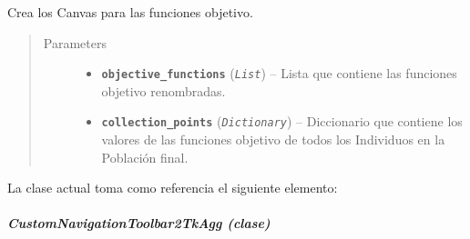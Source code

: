 \documentclass[letterpaper,10pt,english]{sphinxmanual}
\begin{document}
\begin{fulllineitems}
\begin{fulllineitems}
Crea los Canvas para las funciones objetivo.
\begin{quote}\begin{description}
\item[{Parameters}] \leavevmode\begin{itemize}
\item {} 
\textbf{\texttt{objective\_functions}} (\emph{\texttt{List}}) -- Lista que contiene las funciones objetivo renombradas.

\item {} 
\textbf{\texttt{collection\_points}} (\emph{\texttt{Dictionary}}) -- Diccionario que contiene los valores de las funciones objetivo
de todos los Individuos en la Población final.

\end{itemize}

\end{description}\end{quote}

\end{fulllineitems}


\end{fulllineitems}


La clase actual toma como referencia el siguiente elemento:


\subparagraph{CustomNavigationToolbar2TkAgg (clase)}
\label{View/Additional/ResultsGrapher/CustomNavigationToolbar2TkAgg::doc}\label{View/Additional/ResultsGrapher/CustomNavigationToolbar2TkAgg:module-View.Additional.ResultsGrapher.CustomNavigationToolbar2TkAgg}\label{View/Additional/ResultsGrapher/CustomNavigationToolbar2TkAgg:customnavigationtoolbar2tkagg-clase}
\end{document}
